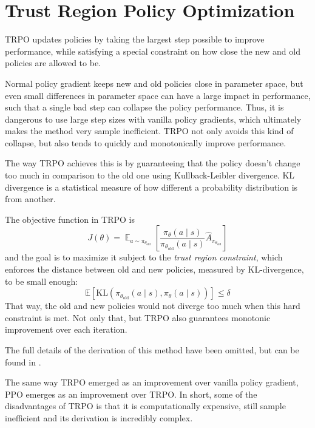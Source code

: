 \section{Trust Region Policy Optimization}
TRPO updates policies by taking the largest step possible to improve performance, while satisfying a special constraint on how close the new and old policies are allowed to be.

Normal policy gradient keeps new and old policies close in parameter space, but even small differences in parameter space can have a large impact in performance, such that a single bad step can collapse the policy performance. Thus, it is dangerous to use large step sizes with vanilla policy gradients, which ultimately makes the method very sample inefficient. TRPO not only avoids this kind of collapse, but also tends to quickly and monotonically improve performance.

The way TRPO achieves this is by guaranteeing that the policy doesn't change too much in comparison to the old one using Kullback-Leibler divergence. KL divergence is a statistical measure of how different a probability distribution is from another.

The objective function in TRPO is
\begin{equation}
    J(\theta) = \displaystyle\mathop{\mathbb{E}}_{a \sim \pi_{\theta_\text{old}}}\left[\frac{\pi_{\theta}(a \mid s)}{\pi_{\theta_\text{old}}(a \mid s)}\hat{A}_{\pi_{\theta_\text{old}}}\right]
\end{equation}
and the goal is to maximize it subject to the \textit{trust region constraint}, which enforces the distance between old and new policies, measured by KL-divergence, to be small enough:
\begin{equation}
    \mathbb{E}[\text{KL}(\pi_{\theta_\text{old}}(a \mid s), \pi_\theta(a \mid s))] \leq \delta
\end{equation}
That way, the old and new policies would not diverge too much when this hard constraint is met. Not only that, but TRPO also guarantees monotonic improvement over each iteration.

The full details of the derivation of this method have been omitted, but can be found in \cite{DBLP:journals/corr/SchulmanLMJA15}.

The same way TRPO emerged as an improvement over vanilla policy gradient, PPO emerges as an improvement over TRPO. In short, some of the disadvantages of TRPO is that it is computationally expensive, still sample inefficient and its derivation is incredibly complex.

